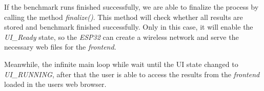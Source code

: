 If the benchmark runs finished successfully, we are able to finalize the process by calling the method \textit{finalize()}. This method will check whether all results are stored and benchmark finished successfully. Only in this case, it will enable the \textit{UI\_Ready} state, so the \textit{ESP32} can create a wireless network and serve the necessary web files for the \textit{frontend}.

Meanwhile, the infinite main loop while wait until the UI state changed to \textit{UI\_RUNNING}, after that the user is able to access the results from the \textit{frontend} loaded in the users web browser.